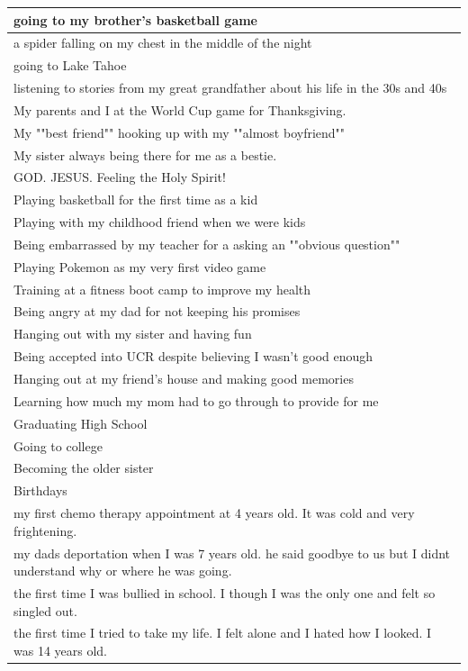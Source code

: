 \documentclass[
  .7em,
  letterpaper,
  DIV=11,
  numbers=noendperiod]{scrartcl}
\begin{document}
\begin{table}
\begin{tabular}{l}
\hline
going to my brother's basketball game\\
\hline
a spider falling on my chest in the middle of the night\\
\hline
going to Lake Tahoe\\
\hline
listening to stories from my great grandfather about his life in the 30s and 40s\\
\hline
My parents and I at the World Cup game for Thanksgiving.\\
\hline
My ""best friend"" hooking up with my ""almost boyfriend""\\
\hline
My sister always being there for me as a bestie.\\
\hline
GOD. JESUS. Feeling the Holy Spirit!\\
\hline
Playing basketball for the first time as a kid\\
\hline
Playing with my childhood friend when we were kids\\
\hline
Being embarrassed by my teacher for a asking an ""obvious question""\\
\hline
Playing Pokemon as my very first video game\\
\hline
Training at a fitness boot camp to improve my health\\
\hline
Being angry at my dad for not keeping his promises\\
\hline
Hanging out with my sister and having fun\\
\hline
Being accepted into UCR despite believing I wasn't good enough\\
\hline
Hanging out at my friend's house and making good memories\\
\hline
Learning how much my mom had to go through to provide for me\\
\hline
Graduating High School\\
\hline
Going to college\\
\hline
Becoming the older sister\\
\hline
Birthdays\\
\hline
my first chemo therapy appointment at 4 years old. It was cold and very frightening.\\
\hline
my dads deportation when I was 7 years old. he said goodbye to us but I didnt understand why or where he was going.\\
\hline
the first time I was bullied in school. I though I was the only one and felt so singled out.\\
\hline
the first time I tried to take my life. I felt alone and I hated how I looked. I was 14 years old.\\

\end{tabular}
\end{table}
\end{document}
